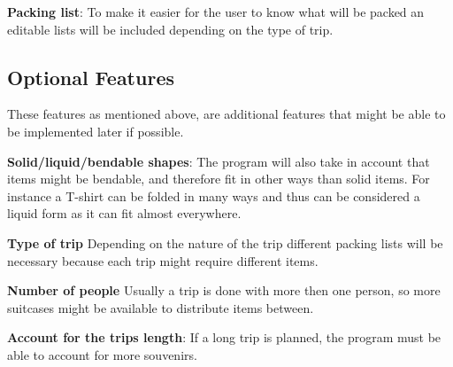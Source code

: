 \textbf{Packing list}:
To make it easier for the user to know what will be packed an editable lists will be included depending on the type of trip.
\newline

\subsection{Optional Features}
These features as mentioned above, are additional features that might be able to be implemented later if possible.\newline

\textbf{Solid/liquid/bendable shapes}:
The program will also take in account that items might be bendable, and therefore fit in other ways than solid items. For instance a T-shirt can be folded in many ways and thus can be considered a liquid form as it can fit almost everywhere.
\newline

\textbf{Type of trip}
Depending on the nature of the trip different packing lists will be necessary because each trip might require different items.
\newline

\textbf{Number of people}
Usually a trip is done with more then one person, so more suitcases might be available to distribute items between.
\newline

\textbf{Account for the trips length}:
If a long trip is planned, the program must be able to account for more souvenirs.
\newline